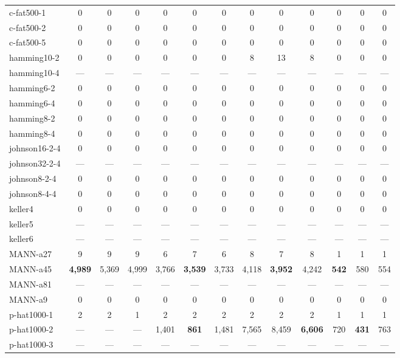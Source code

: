 \documentclass{l4proj}
\begin{document}
\begin{table}
\begin{center}
\begin{tiny}
\begin{tabular}{|l|c c c|c c c|c c c|c c c|}
c-fat500-1 & 0 & 0 & 0 & 0 & 0 & 0 & 0 & 0 & 0 & 0 & 0 & 0 \\ 
c-fat500-2 & 0 & 0 & 0 & 0 & 0 & 0 & 0 & 0 & 0 & 0 & 0 & 0 \\ 
c-fat500-5 & 0 & 0 & 0 & 0 & 0 & 0 & 0 & 0 & 0 & 0 & 0 & 0 \\ 
hamming10-2 & 0 & 0 & 0 & 0 & 0 & 0 & 8 & 13 & 8 & 0 & 0 & 0 \\ 
hamming10-4 & --- & --- & --- & --- & --- & --- & --- & --- & --- & --- & --- & --- \\ 
hamming6-2 & 0 & 0 & 0 & 0 & 0 & 0 & 0 & 0 & 0 & 0 & 0 & 0 \\ 
hamming6-4 & 0 & 0 & 0 & 0 & 0 & 0 & 0 & 0 & 0 & 0 & 0 & 0 \\ 
hamming8-2 & 0 & 0 & 0 & 0 & 0 & 0 & 0 & 0 & 0 & 0 & 0 & 0 \\ 
hamming8-4 & 0 & 0 & 0 & 0 & 0 & 0 & 0 & 0 & 0 & 0 & 0 & 0 \\ 
johnson16-2-4 & 0 & 0 & 0 & 0 & 0 & 0 & 0 & 0 & 0 & 0 & 0 & 0 \\ 
johnson32-2-4 & --- & --- & --- & --- & --- & --- & --- & --- & --- & --- & --- & --- \\ 
johnson8-2-4 & 0 & 0 & 0 & 0 & 0 & 0 & 0 & 0 & 0 & 0 & 0 & 0 \\ 
johnson8-4-4 & 0 & 0 & 0 & 0 & 0 & 0 & 0 & 0 & 0 & 0 & 0 & 0 \\ 
keller4 & 0 & 0 & 0 & 0 & 0 & 0 & 0 & 0 & 0 & 0 & 0 & 0 \\ 
keller5 & --- & --- & --- & --- & --- & --- & --- & --- & --- & --- & --- & --- \\ 
keller6 & --- & --- & --- & --- & --- & --- & --- & --- & --- & --- & --- & --- \\ 
MANN-a27 & 9 & 9 & 9 & 6 & 7 & 6 & 8 & 7 & 8 & 1 & 1 & 1 \\ 
MANN-a45 & \bf{4,989} & 5,369 & 4,999 & 3,766 & \bf{3,539} & 3,733 & 4,118 & \bf{3,952} & 4,242 & \bf{542} & 580 & 554 \\ 
MANN-a81 & --- & --- & --- & --- & --- & --- & --- & --- & --- & --- & --- & --- \\ 
MANN-a9 & 0 & 0 & 0 & 0 & 0 & 0 & 0 & 0 & 0 & 0 & 0 & 0 \\ 
p-hat1000-1 & 2 & 2 & 1 & 2 & 2 & 2 & 2 & 2 & 2 & 1 & 1 & 1 \\ 
p-hat1000-2 & --- & --- & --- & 1,401 & \bf{861} & 1,481 & 7,565 & 8,459 & \bf{6,606} & 720 & \bf{431} & 763 \\ 
p-hat1000-3 & --- & --- & --- & --- & --- & --- & --- & --- & --- & --- & --- & --- \\ 

\end{tabular}
\end{tiny}
\end{center}
\end{table}
\end{document}
